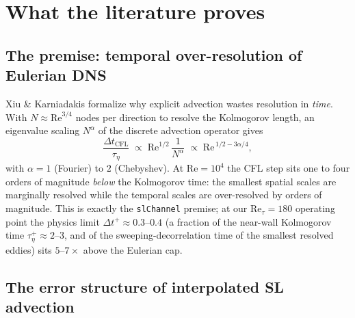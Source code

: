 \documentclass[11pt,a4paper]{article}
\newcommand{\Ret}{\mathrm{Re}_\tau}
\newcommand{\dtp}{\Delta t^{+}}
\begin{document}
\section{What the literature proves}

\subsection{The premise: temporal over-resolution of Eulerian DNS}

Xiu \& Karniadakis \cite{xiu01} formalize why explicit advection wastes
resolution in \emph{time}. With $N\approx \mathrm{Re}^{3/4}$ nodes per
direction to resolve the Kolmogorov length, an eigenvalue scaling
$N^{\alpha}$ of the discrete advection operator gives
\begin{equation}
\frac{\Delta t_{\mathrm{CFL}}}{\tau_\eta}
\;\propto\; \mathrm{Re}^{1/2}\,\frac{1}{N^{\alpha}}
\;\propto\; \mathrm{Re}^{\,1/2-3\alpha/4},
\label{eq:overresolve}
\end{equation}
with $\alpha=1$ (Fourier) to $2$ (Chebyshev). At $\mathrm{Re}=10^4$ the CFL
step sits one to four orders of magnitude \emph{below} the Kolmogorov time:
the smallest spatial scales are marginally resolved while the temporal scales
are over-resolved by orders of magnitude. This is exactly the
\texttt{slChannel} premise; at our $\Ret=180$ operating point the physics
limit $\dtp\approx0.3$--$0.4$ (a fraction of the near-wall Kolmogorov time
$\tau_\eta^{+}\approx 2$--$3$, and of the sweeping-decorrelation time of the
smallest resolved eddies) sits $5$--$7\times$ above the Eulerian cap.

\subsection{The error structure of interpolated SL advection}
\end{document}
